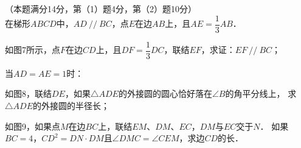 \documentclass{article}
\begin{document}
\begin{question}[25]
    \item （本题满分14分，第（1）题4分，第（2）题10分）\\[5pt]
    在梯形$ABCD$中，$AD~//~BC$，点$E$在边$AB$上，且$AE=\dfrac{1}{3}AB$．
    \begin{squestion}
        \item \vspace{0.1cm} 如图7所示，点$F$在边$CD$上，且$DF=\dfrac{1}{3}DC$，联结$EF$，求证：$EF~//~BC$；
        \item \vspace{0.1cm} 当$AD=AE=1$时：
        \begin{ssquestion}
            \item 如图8，联结$DE$，如果$\triangle ADE$的外接圆的圆心恰好落在$\angle B$的角平分线上，
                  求$\triangle ADE$的外接圆的半径长；
            \item \vspace{0.1cm} 如图9，如果点$M$在边$BC$上，联结$EM$、$DM$、$EC$，$DM$与$EC$交于$N$．
                  如果$BC=4$，$CD^2=DN\cdot DM$且$\angle DMC=\angle CEM$，求边$CD$的长．
        \end{ssquestion}
    \end{squestion}
\end{question} \leavevmode \\
\end{document}
